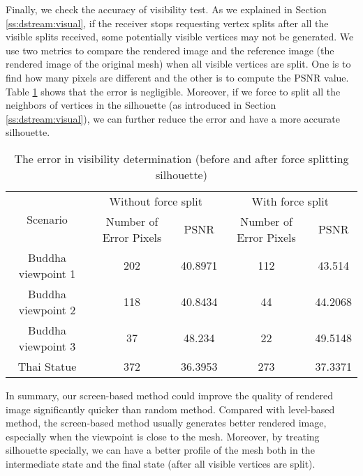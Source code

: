 Finally, we check the accuracy of visibility test. 
As we explained in Section \ref{ss:dstream:visual}, 
if the receiver stops requesting vertex splits after all the visible splits received,
some potentially visible vertices may not be generated.
We use two metrics to compare the rendered image and the reference image (the rendered image of the original mesh)
when all visible vertices are split. One is to find
how many pixels are different and the other is to compute the PSNR value. 
Table \ref{t:dstream:error} shows that the error is negligible.
Moreover, if we force to split all the neighbors of vertices in the silhouette
(as introduced in Section \ref{ss:dstream:visual}),
we can further reduce the error and have a more accurate silhouette.
\begin{table}
    \centering
    \begin{tabular}{|c|c|c|c|c|}
        \hline
        \multirow{2}{*}{Scenario}    &    \multicolumn{2}{c|}{Without force split}   & \multicolumn{2}{c|}{With force split}\\
        \cline{2-5}
         &   Number of Error Pixels   &   PSNR    &  Number of Error Pixels  & PSNR \\
        \hline
        Buddha viewpoint 1 &          202              &   40.8971 &  112                         &    43.514\\
        Buddha viewpoint 2 &          118              &   40.8434 &  44                          &    44.2068\\
        Buddha viewpoint 3 &           37              &   48.234  &  22                          &    49.5148\\
        Thai   Statue      &          372              &   36.3953 &  273                         &    37.3371\\
        \hline
    \end{tabular}
    \caption{The error in visibility determination (before and after force splitting silhouette)}
    \label{t:dstream:error}
\end{table}

In summary, our screen-based method could improve the quality of rendered image significantly quicker than random method. Compared
with level-based method, the screen-based method usually generates better rendered image, especially when the viewpoint is close to the mesh. 
Moreover, by treating silhouette specially, we can have a better profile of the mesh both in the intermediate state and the final state (after
all visible vertices are split). 


